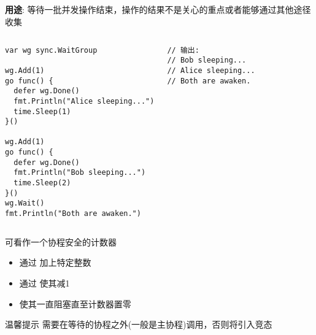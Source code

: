 \subsection{\WaitGroup}
\begin{frame}[fragile]{\WaitGroup}
   \textbf{用途}: 等待一批并发操作结束，\alert{操作的结果不是关心的重点或者能够通过其他途径收集} 

   \begin{columns}[t]
\begin{lstlisting}[xleftmargin=8pt]
var wg sync.WaitGroup

wg.Add(1)
go func() {
  defer wg.Done()
  fmt.Println("Alice sleeping...")
  time.Sleep(1)
}()

wg.Add(1)
go func() {
  defer wg.Done()
  fmt.Println("Bob sleeping...")
  time.Sleep(2)
}()
wg.Wait()
fmt.Println("Both are awaken.")
\end{lstlisting}

\begin{lstlisting}[firstnumber=last,xleftmargin=16pt]
// 输出:
// Bob sleeping...
// Alice sleeping...
// Both are awaken.
\end{lstlisting}
   \end{columns}
\end{frame}

\begin{frame}{\WaitGroup}
    \WaitGroup 可看作一个\alert{协程安全}的计数器

    \begin{itemize}
        \item 通过 加上特定整数
        \item 通过 使其减1
        \item {}使其一直阻塞直至计数器置零
    \end{itemize}

    \pause
    \begin{alertblock}{温馨提示}
        需要在\WaitGroup 等待的协程之外(一般是主协程)调用，否则将引入\alert{竞态}
    \end{alertblock}
\end{frame}